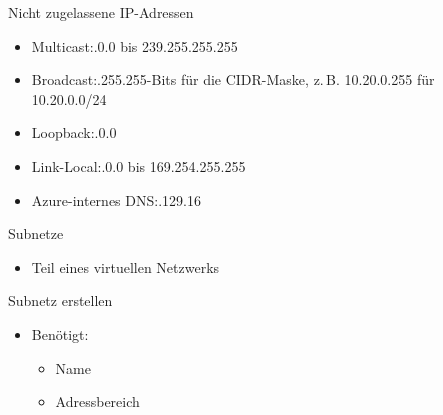 \begin{flashcard}[Definition]{Nicht zugelassene IP-Adressen}
    \begin{itemize}
        \item Multicast:.0.0 bis 239.255.255.255
        \item Broadcast:.255.255-Bits für die CIDR-Maske, z.\,B. 10.20.0.255 für 10.20.0.0/24
        \item Loopback:.0.0
        \item Link-Local:.0.0 bis 169.254.255.255
        \item Azure-internes DNS:.129.16
    \end{itemize}
\end{flashcard}


\begin{flashcard}[Definition]{Subnetze}
    \begin{itemize}
        \item Teil eines virtuellen Netzwerks
    \end{itemize}
\end{flashcard}

\begin{flashcard}[Definition]{Subnetz erstellen}
    \begin{itemize}
        \item Benötigt:
        \begin{itemize}
            \item Name
            \item Adressbereich
        \end{itemize}
    \end{itemize}
\end{flashcard}

